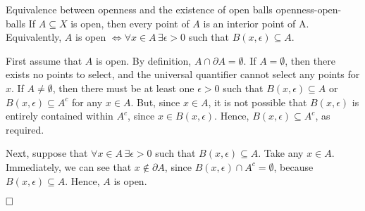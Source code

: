 \documentclass{article}
\renewcommand*\qedsymbol{\hfill\ensuremath{\Box}}
\numberwithin{equation}{section}
\begin{document}
\begin{theorem}{Equivalence between openness and the existence of open balls}
        {openness-open-balls}
    If $ A \subseteq X $ is open, then every point of $ A $ is an interior point
    of A. Equivalently, $ A $ is open $ \iff \forall x \in A\, \exists \epsilon
    > 0 $ such that $ B (x, \epsilon) \subseteq A $.

    First assume that $ A $ is open. By definition, $ A \cap \partial A =
    \emptyset $. If $ A = \emptyset $, then there exists no points to select,
    and the universal quantifier cannot select any points for $ x $. If $ A \neq
    \emptyset $, then there must be at least one $ \epsilon > 0 $ such that $
    B(x, \epsilon) \subseteq A $ or $ B(x, \epsilon) \subseteq A^c $ for any $ x
    \in A $. But, since $ x \in A $, it is not possible that $ B(x, \epsilon) $
    is entirely contained within $ A^c $, since $ x \in B(x, \epsilon) $. Hence,
    $ B(x, \epsilon) \subseteq A^c $, as required.

    Next, suppose that $ \forall x \in A\, \exists \epsilon > 0 $ such that $ B
    (x, \epsilon) \subseteq A $. Take any $ x \in A $. Immediately, we can see
    that $ x \not\in \partial A $, since $ B(x, \epsilon) \cap A^c = \emptyset
    $, because $ B(x, \epsilon) \subseteq A $. Hence, $ A $ is open.

    $ \qedsymbol $
\end{theorem}
\end{document}
